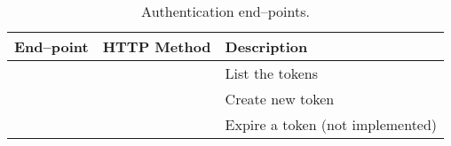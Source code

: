 \begin{table}[htpb]
    \centering
    \begin{tabu} to \textwidth {lX[c]l}
        End--point                         & HTTP Method & Description                                     \\
        \midrule
                        &          & List the tokens                          \\
                        &         & Create new token                         \\
                   &       & Expire a token (not implemented)         \\
    \end{tabu}
    \caption{Authentication end--points.}
    \label{tab:rest_auth}
\end{table}
